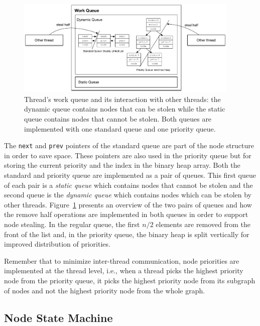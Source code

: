 \begin{figure}[t]
\centering
\includegraphics[width=0.95\textwidth]{figures/implementation/work_queue.pdf}
\caption{Thread's work queue and its interaction with other threads: the dynamic queue contains nodes that can be
   stolen while the static queue contains nodes that cannot be stolen. Both
   queues are implemented with one standard queue and one priority queue.}
\label{fig:implementation:work_queue}
\end{figure}

The \texttt{next} and \texttt{prev} pointers of the standard queue are part of
the node structure in order to save space. These pointers are also used in the
priority queue but for storing the current priority and the index in the binary
heap array. Both the standard and priority queue are implemented as a pair of
queues. This first queue of each pair is a \emph{static queue} which contains
nodes that cannot be stolen and the second queue is the \emph{dynamic queue}
which contains nodes which can be stolen by other threads.
Figure~\ref{fig:implementation:work_queue} presents an overview of the two pairs
of queues and how the remove half operations are implemented in both queues in
order to support node stealing.  In the regular queue, the first $n/2$ elements
are removed from the front of the list and, in the priority queue, the binary
heap is split vertically for improved distribution of priorities.

Remember that to minimize inter-thread communication, node priorities are
implemented at the thread level, i.e., when a thread picks the highest priority
node from the priority queue, it picks the highest priority node from its
subgraph of nodes and not the highest priority node from the whole graph.

\subsection{Node State Machine}\label{sec:node_state_machine}

